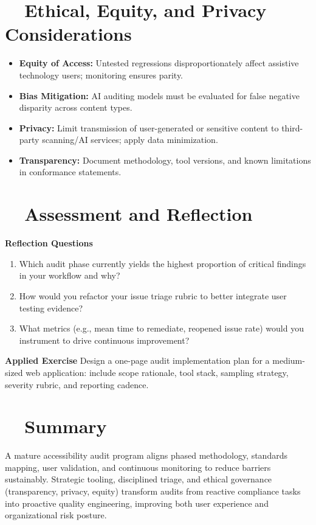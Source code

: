 \section{~~Ethical, Equity, and Privacy Considerations}\label{sec:ethics-equity-auditing}
\begin{itemize}
	\item \textbf{Equity of Access:} Untested regressions disproportionately affect assistive technology users; monitoring ensures parity.
	\item \textbf{Bias Mitigation:} AI auditing models must be evaluated for false negative disparity across content types.
	\item \textbf{Privacy:} Limit transmission of user-generated or sensitive content to third-party scanning/AI services; apply data minimization.
	\item \textbf{Transparency:} Document methodology, tool versions, and known limitations in conformance statements.
\end{itemize}

\section{~~Assessment and Reflection}\label{sec:assessment-reflection-auditing}
\textbf{Reflection Questions}
\begin{enumerate}
	\item Which audit phase currently yields the highest proportion of critical findings in your workflow and why?
	\item How would you refactor your issue triage rubric to better integrate user testing evidence?
	\item What metrics (e.g., mean time to remediate, reopened issue rate) would you instrument to drive continuous improvement?
\end{enumerate}
\textbf{Applied Exercise} Design a one-page audit implementation plan for a medium-sized web application: include scope rationale, tool stack, sampling strategy, severity rubric, and reporting cadence.

\section{~~Summary}\label{sec:summary-auditing}
A mature accessibility audit program aligns phased methodology, standards mapping, user validation, and continuous monitoring to reduce barriers sustainably. Strategic tooling, disciplined triage, and ethical governance (transparency, privacy, equity) transform audits from reactive compliance tasks into proactive quality engineering, improving both user experience and organizational risk posture.


